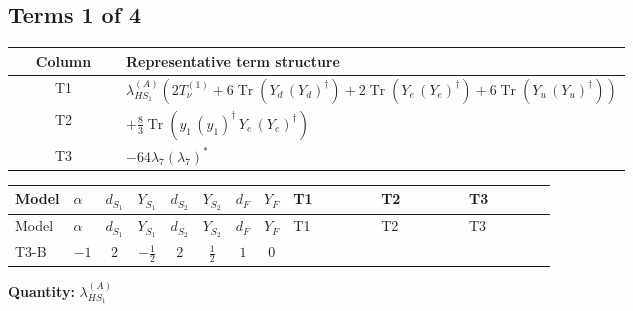\documentclass[8pt]{article}
\begin{document}
\begin{landscape}
\subsection*{Terms 1 of 4}
\begin{center}
\begin{tabular}{@{}c >{\raggedright\arraybackslash}p{0.82\linewidth}@{}}
\toprule
Column & Representative term structure \\
\midrule
T1 & \(\displaystyle {\lambda_{HS_1}^{(A)}} (2 T_{\nu}^{(1)}+6 \operatorname{Tr}\!\left({Y_d}\,\left({Y_d}\right)^{\dagger}\right)+2 \operatorname{Tr}\!\left({Y_e}\,\left({Y_e}\right)^{\dagger}\right)+6 \operatorname{Tr}\!\left({Y_u}\,\left({Y_u}\right)^{\dagger}\right))\) \\
\midrule
T2 & \(\displaystyle +\frac{8}{3} \operatorname{Tr}\!\left({y_1}\,\left({y_1}\right)^{\dagger}\,{Y_e}\,\left({Y_e}\right)^{\dagger}\right)\) \\
\midrule
T3 & \(\displaystyle -64 {\lambda_{7}} \left({\lambda_{7}}\right)^{*}\) \\
\midrule
\bottomrule
\end{tabular}
\end{center}
\smallskip
\tiny
\begin{longtable}{@{}llcccccc >{\raggedright\arraybackslash}p{0.21\linewidth} >{\raggedright\arraybackslash}p{0.21\linewidth} >{\raggedright\arraybackslash}p{0.21\linewidth}@{}}
\toprule
Model & $\alpha$ & $d_{S_1}$ & $Y_{S_1}$ & $d_{S_2}$ & $Y_{S_2}$ & $d_F$ & $Y_F$ & T1 & T2 & T3 \\
\midrule
\endfirsthead
\toprule
Model & $\alpha$ & $d_{S_1}$ & $Y_{S_1}$ & $d_{S_2}$ & $Y_{S_2}$ & $d_F$ & $Y_F$ & T1 & T2 & T3 \\
\midrule
\endhead
T3-B & $-1$ & $2$ & $-\frac{1}{2}$ & $2$ & $\frac{1}{2}$ & $1$ & $0$ & \scriptsize\adjustbox{max width=\linewidth}{$\begin{gathered} {\lambda_{HS_1}^{(A)}} (2 T_{\nu}^{(1)}+6 \operatorname{Tr}\!\left({Y_d}\,\left({Y_d}\right)^{\dagger}\right)+2 \operatorname{Tr}\!\left({Y_e}\,\left({Y_e}\right)^{\dagger}\right)+6 \operatorname{Tr}\!\left({Y_u}\,\left({Y_u}\right)^{\dagger}\right))\end{gathered}$} & \scriptsize\adjustbox{max width=\linewidth}{$\begin{gathered} +\frac{8}{3} \operatorname{Tr}\!\left({y_1}\,\left({y_1}\right)^{\dagger}\,{Y_e}\,\left({Y_e}\right)^{\dagger}\right)\end{gathered}$} & \scriptsize\adjustbox{max width=\linewidth}{$\begin{gathered} -64 {\lambda_{7}} \left({\lambda_{7}}\right)^{*}\end{gathered}$} \\
\midrule
\bottomrule
\end{longtable}
\clearpage
\noindent\textbf{Quantity: }$\lambda_{HS_1}^{(A)}$\par\smallskip

\end{landscape}
\end{document}
